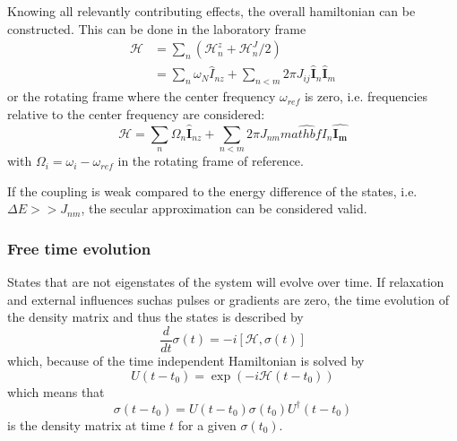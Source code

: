             Knowing all relevantly contributing effects, the overall hamiltonian can be constructed. This can be done in the laboratory frame
            \begin{align}
                \mathcal{H} &= \sum_n\left(\mathcal{H}_n^z + \mathcal{H}_n^J/2\right)\\
                            &= \sum_{n}\omega_N\hat{I}_{nz} + \sum_{n<m}2\pi J_{ij} \hat{\mathbf{I}}_n\hat{\mathbf{I}}_m
            \end{align}
            or the rotating frame where the center frequency $\omega_{ref}$ is zero, i.e. frequencies relative to the center frequency are considered:
            \begin{equation}
                \mathcal{H} = \sum_n{\Omega_n\hat{\mathbf{I}}_{nz}} + \sum_{n<m}{2\pi J_{nm}\hat{mathbf{I_n}}\hat{\mathbf{I_m}}}
            \end{equation}
            with $\Omega_i = \omega_i - \omega_{ref}$ in the rotating frame of reference.

            If the coupling is weak compared to the energy difference of the states, i.e. $\Delta E >> J_{nm}$, the secular approximation can be considered valid. 
        \subsubsection{Free time evolution}
        States that are not eigenstates of the system will evolve over time. If relaxation and external influences suchas pulses or gradients are zero, the time evolution of the density matrix and thus the states is described by 
        \begin{equation}
            \frac{d}{dt} \sigma(t) = -i \left[\mathcal{H}, \sigma(t)\right]
        \end{equation}
        which, because of the time independent Hamiltonian is solved by
        \begin{equation*}
            U(t-t_0) = \exp(-i\mathcal{H}(t-t_0))
        \end{equation*}
        which means that
        \begin{equation}
            \sigma(t-t_0) = U(t-t_0) \sigma(t_0) U^\dagger(t-t_0)
        \end{equation}
        is the density matrix at time $t$ for a given $\sigma(t_0)$.

